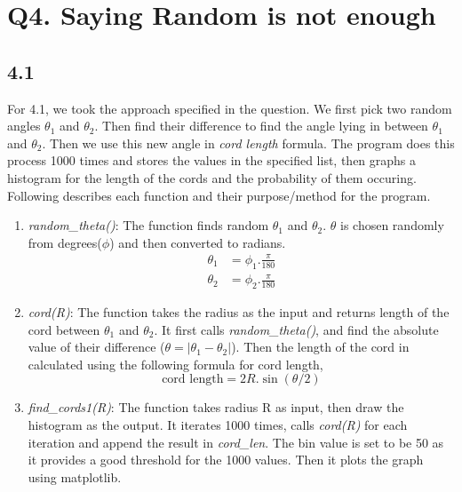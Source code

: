 \documentclass[answers]{exam}
\begin{document}
    \section*{Q4. Saying Random is not enough}

    \subsection*{4.1}
    \begin{framed}
        For 4.1, we took the approach specified in the question. We first pick two random angles $\theta_1$ and $\theta_2$. Then find their difference to find the angle lying in between $\theta_1$ and $\theta_2$. Then we use this new angle in \emph{cord length} formula. The program does this process 1000 times and stores the values in the specified list, then graphs a histogram for the length of the cords and the probability of them occuring. Following describes each function and their purpose/method for the program.
        \begin{enumerate}
            \item \emph{random\_theta()}: The function finds random $\theta_1$ and $\theta_2$. $\theta$ is chosen randomly from degrees($\phi$) and then converted to radians.
                    \begin{align*}
                        \theta_1 &= \phi_1 . \frac{\pi}{180}\\
                        \theta_2 &= \phi_2 . \frac{\pi}{180}
                    \end{align*}
            \item \emph{cord(R)}: The function takes the radius as the input and returns length of the cord between $\theta_1$ and $\theta_2$. It first calls \emph{random\_theta()}, and find the absolute value of their difference ($\theta=|\theta_1 - \theta_2|$). Then the length of the cord in calculated using the following formula for cord length,
                    $$\text{cord length}=2R.\sin(\theta/2)$$
            \item \emph{find\_cords1(R)}: The function takes radius R as input, then draw the histogram as the output. It iterates 1000 times, calls \emph{cord(R)} for each iteration and append the result in \emph{cord\_len}. The bin value is set to be 50 as it provides a good threshold for the 1000 values. Then it plots the graph using matplotlib.
        \end{enumerate}
    \end{framed}
\end{document}
